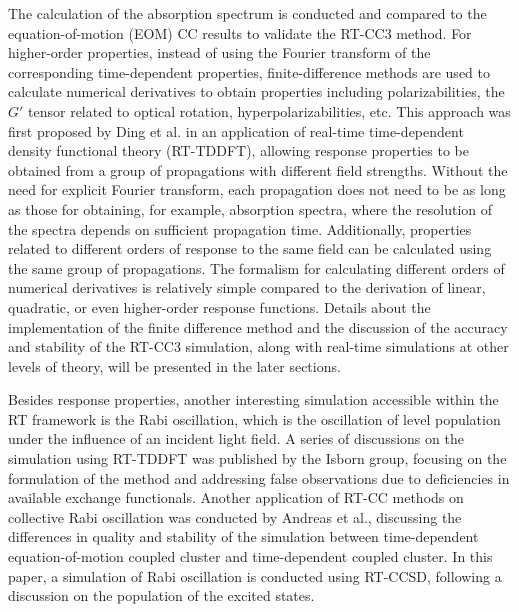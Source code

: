 The calculation of the absorption spectrum is conducted and compared to the equation-of-motion (EOM) CC results to validate the RT-CC3 method. For higher-order properties, instead of using the Fourier transform of the corresponding time-dependent properties, finite-difference methods\cite{Perrone1975} are used to calculate numerical derivatives to obtain properties including polarizabilities, the $G'$ tensor related to optical rotation, hyperpolarizabilities, etc. This approach was first proposed by Ding et al. in an application of real-time time-dependent density functional theory (RT-TDDFT), allowing response properties to be obtained from a group of propagations with different field strengths.\cite{Ding2013} Without the need for explicit Fourier transform, each propagation does not need to be as long as those for obtaining, for example, absorption spectra, where the resolution of the spectra depends on sufficient propagation time. Additionally, properties related to different orders of response to the same field can be calculated using the same group of propagations. The formalism for calculating different orders of numerical derivatives is relatively simple compared to the derivation of linear, quadratic, or even higher-order response functions. Details about the implementation of the finite difference method and the discussion of the accuracy and stability of the RT-CC3 simulation, along with real-time simulations at other levels of theory, will be presented in the later sections.

Besides response properties, another interesting simulation accessible within the RT framework is the Rabi oscillation,\cite{Knorr1994} which is the oscillation of level population under the influence of an incident light field. A series of discussions on the simulation using RT-TDDFT was published by the Isborn group, focusing on the formulation of the method and addressing false observations due to deficiencies in available exchange functionals.\cite{Habenicht2014, Provorse2015, Provorse2016, Ranka2023} Another application of RT-CC methods on collective Rabi oscillation was conducted by Andreas et al., discussing the differences in quality and stability of the simulation between time-dependent equation-of-motion coupled cluster and time-dependent coupled cluster.\cite{Skeidsvoll2023} In this paper, a simulation of Rabi oscillation is conducted using RT-CCSD, following a discussion on the population of the excited states.



